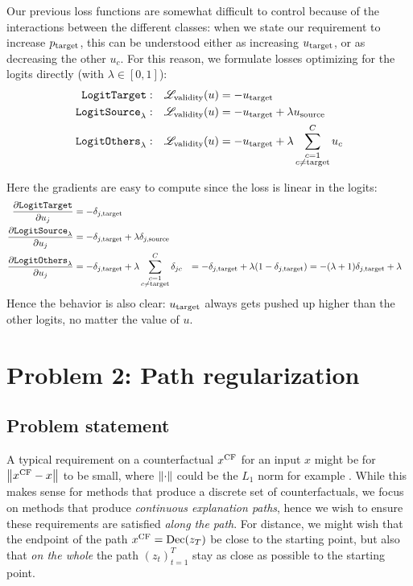 \documentclass[../main.tex]{subfiles}
\begin{document}
Our previous loss functions are somewhat difficult to control because of the interactions between the different classes:
when we state our requirement to increase $p_{\mathrm{target}}$, this can be understood either as increasing $u_{\mathrm{target}}$, or as decreasing the other $u_c$.
For this reason, we formulate losses optimizing for the logits directly (with $\lambda \in [0, 1]$):
\begin{align*}
    \mathtt{LogitTarget}{}:        & \quad    \mathscr{L}_\text{validity}(u) = - u_{\mathrm{target}}                         \\
    \mathtt{LogitSource}_{\lambda}: & \quad     \mathscr{L}_\text{validity}(u) = - u_{\mathrm{target}} + \lambda u_{\mathrm{source}}    \\
    \mathtt{LogitOthers}_{\lambda}: & \quad    \mathscr{L}_\text{validity}(u) = - u_{\mathrm{target}} + \lambda \sum_{\substack{{c}=1 \\ {c} \neq \mathrm{target}}}^C u_c
\end{align*}

Here the gradients are easy to compute since the loss is linear in the logits:
\begin{align*}
\frac{\partial \mathtt{LogitTarget}{}}{\partial u_j} &= - \delta_{j, \mathrm{target}}                         \\
\frac{\partial \mathtt{LogitSource}_{\lambda}}{\partial u_j} &= - \delta_{j, \mathrm{target}} + \lambda \delta_{j, \mathrm{source}}                        \\
\frac{\partial \mathtt{LogitOthers}_{\lambda}}{\partial u_j}
&= - \delta_{j, \mathrm{target}} + \lambda \sum_{\substack{{c}=1 \\ {c} \neq \mathrm{target}}}^C \delta_{jc}
&= - \delta_{j, \mathrm{target}} + \lambda (1 - \delta_{j, \mathrm{target}})
&= -(\lambda + 1)\delta_{j, \mathrm{target}} + \lambda
\end{align*}
Hence the behavior is also clear: $u_{\mathrm{target}}$ always gets pushed up higher than the other logits, no matter the value of $u$.



\section{Problem 2: Path regularization}

\subsection{Problem statement}

A typical requirement on a counterfactual $x^\mathrm{CF}$ for an input $x$ might be for $\left\lVert x^\mathrm{CF} - x\right\rVert$ to be small, where $\left\lVert\cdot\right\rVert$ could be the $L_1$ norm for example .
While this makes sense for methods that produce a discrete set of counterfactuals, we focus on methods that produce \emph{continuous explanation paths}, hence we wish to ensure these requirements are satisfied \emph{along the path}.
For distance, we might wish that the endpoint of the path $x^\mathrm{CF} = \operatorname{Dec}(z_T)$ be close to the starting point, but also that \emph{on the whole} the path $(z_t)_{t=1}^T$ stay as close as possible to the starting point.
\end{document}
